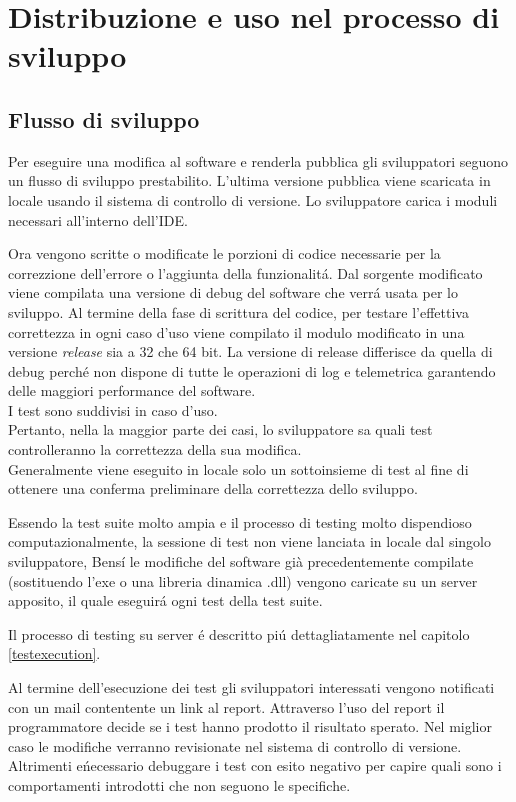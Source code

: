 \chapter{Distribuzione e uso nel processo di sviluppo}
    \section{Flusso di sviluppo}
        Per eseguire una modifica al software e renderla pubblica gli sviluppatori seguono un flusso di sviluppo prestabilito.
        L'ultima versione pubblica viene scaricata in locale usando il sistema di controllo di versione.
        Lo sviluppatore carica i moduli necessari all'interno dell'IDE.

        Ora vengono scritte o modificate le porzioni di codice necessarie per la correzzione dell'errore o l'aggiunta della funzionalit\'a.
        Dal sorgente modificato viene compilata una versione di debug del software che verr\'a usata per lo sviluppo.
        Al termine della fase di scrittura del codice, per testare l'effettiva correttezza in ogni caso d'uso viene compilato il modulo modificato in una versione \textit{release} sia a 32 che 64 bit.
        La versione di release differisce da quella di debug perch\'e non dispone di tutte le operazioni di log e telemetrica garantendo delle maggiori performance del software.\\
        
        I test sono suddivisi in caso d'uso.\\
        Pertanto, nella la maggior parte dei casi, lo sviluppatore sa quali test  controlleranno la correttezza della sua modifica.\\
        Generalmente viene eseguito in locale solo un sottoinsieme di test al fine di ottenere una conferma preliminare della correttezza dello sviluppo.

        Essendo la test suite molto ampia e il processo di testing molto dispendioso computazionalmente, 
        la sessione di test non viene lanciata in locale dal singolo sviluppatore, 
        Bens\'i  le modifiche del software già precedentemente compilate (sostituendo l’exe o una libreria dinamica .dll) 
        vengono caricate su un server apposito, il quale eseguir\'a ogni test della test suite.

        Il processo di testing su server \'e descritto pi\'u dettagliatamente nel capitolo \ref{testexecution}.
        
        Al termine dell'esecuzione dei test gli sviluppatori interessati vengono notificati con un mail contentente un link al report.
        Attraverso l'uso del report il programmatore decide se i test hanno prodotto il risultato sperato.
        Nel miglior caso le modifiche verranno revisionate nel sistema di controllo di versione.
        Altrimenti e\' necessario debuggare i test con esito negativo per capire quali sono i comportamenti introdotti che non seguono le specifiche. 

